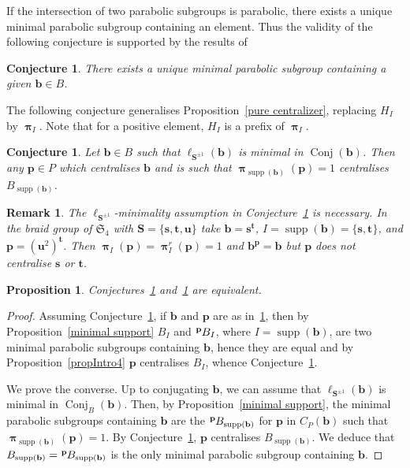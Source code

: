\documentclass{amsart}
\numberwithin{equation}{section}
\newtheorem{proposition}[equation]{Proposition}
\newtheorem{remark}[equation]{Remark}
\newtheorem{conjecture}[equation]{Conjecture}
\newcommand\lexp[2]{\kern\scriptspace\vphantom{#2}^{#1}\kern-\scriptspace#2}
\newcommand\lS{{\ell_{\bS^{\pm1}}}}
\newcommand\bb{{\mathbf b}}
\newcommand\bp{{\mathbf p}}
\newcommand\bs{{\mathbf s}}
\newcommand\bt{{\mathbf t}}
\newcommand\bu{{\mathbf u}}
\newcommand\bS{{\mathbf S}}
\DeclareMathOperator\bpi{\boldsymbol\pi}
\DeclareMathOperator\supp{supp}
\DeclareMathOperator\conj{Conj}
\begin{document}
If the intersection of two
parabolic subgroups is parabolic, there exists a unique minimal parabolic subgroup
containing an element.
Thus the validity of the following conjecture is supported by the results of
\cite{AntolinFoniqi,CumplidoetAll3,CumplidoetAll,CumplidoetAll2,Morris-Wright}
\begin{conjecture}\label{conjecture1}
There exists a unique minimal parabolic subgroup containing a given $\bb\in B$.
\end{conjecture}
The following conjecture generalises Proposition~\ref{pure centralizer},
replacing $H_I$ by $\bpi_I$. Note that for a positive element, $H_I$ is a
prefix of $\bpi_I$.
\begin{conjecture}\label{conjecture2}
Let $\bb\in B$ such that $\lS(\bb)$  is minimal in $\conj(\bb)$.
Then any $\bp\in P$ which centralises $\bb$ and is such that
$\bpi_{\supp(\bb)}(\bp)=1$ centralises $B_{\supp(\bb)}$.
\end{conjecture}
\begin{remark}
The   $\lS$-minimality  assumption   in  Conjecture~\ref{conjecture2}  is
necessary.  In the  braid group  of $\mathfrak  S_4$ with $\bS=\{\bs,\bt,\bu\}$
take $\bb=\bs^\bt$, $I=\supp(\bb)=\{\bs,\bt\}$, and $\bp=(\bu^2)^\bt$. Then
$\bpi_I(\bp)=\bpi^r_I(\bp)=1$   and  $\bb^\bp=\bb$   but  $\bp$   does  not
centralise $\bs$ or $\bt$.
\end{remark}

\begin{proposition} Conjectures~\ref{conjecture1} and~\ref{conjecture2}
are equivalent.
\end{proposition}
\begin{proof}
Assuming Conjecture~\ref{conjecture1}, 
if $\bb$ and $\bp$ are as in~\ref{conjecture2}, then by 
Proposition~\ref{minimal support} $B_I$ and  $\lexp\bp B_I$, where
$I=\supp(\bb)$, are two minimal parabolic subgroups containing $\bb$,
hence they are equal
and by Proposition~\ref{propIntro4} $\bp$ centralises $B_I$, 
whence Conjecture~\ref{conjecture2}.

We  prove  the  converse.  Up  to  conjugating  $\bb$, we can assume that
$\lS(\bb)$  is  minimal in $\conj_B(\bb)$.
Then, by  Proposition~\ref{minimal  support},  the
minimal  parabolic subgroups containing $\bb$ are the $\lexp\bp B_{\supp(\bb)}$ for $\bp$
in $C_P(\bb)$ such that $\bpi_{\supp(\bb)}(\bp)=1$.
By  Conjecture~\ref{conjecture2},  $\bp$ centralises
$B_{\supp(\bb)}$. We deduce that $B_{\supp(\bb)}=\lexp\bp B_{\supp(\bb)}$ is the
only minimal parabolic subgroup containing $\bb$.
\end{proof}
\end{document}
